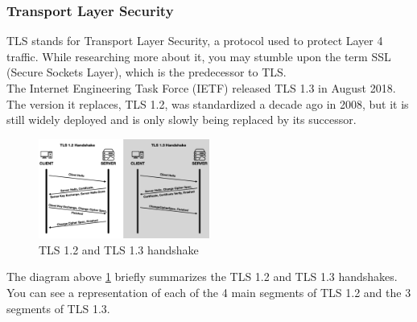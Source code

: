 \subsubsection{Transport Layer Security}\cite{b38}
TLS stands for Transport Layer Security, a protocol used to protect Layer 4 traffic. 
While researching more about it, you may stumble upon the term SSL (Secure Sockets Layer), 
which is the predecessor to TLS.
\\
The Internet Engineering Task Force (IETF) released TLS 1.3 in August 2018. The version it 
replaces, TLS 1.2, was standardized a decade ago in 2008, but it is still widely deployed 
and is only slowly being replaced by its successor.
\begin{figure}[H] %
    \centering %
    \includegraphics[width=0.5\textwidth]{figures/TLS.png} %
    \caption{TLS 1.2 and TLS 1.3 handshake} %
    \label{Fig.2: TLS 1.2 and TLS 1.3 handshake} %
\end{figure}
The diagram above \ref{Fig.2: TLS 1.2 and TLS 1.3 handshake} briefly summarizes the 
TLS 1.2 and TLS 1.3 handshakes. You can see a 
representation of each of the 4 main segments of TLS 1.2 and the 3 segments of TLS 1.3.
